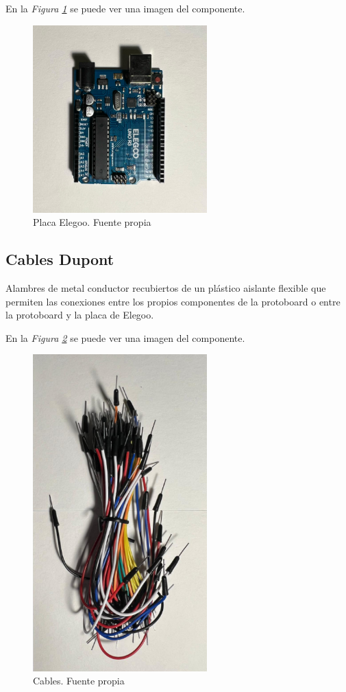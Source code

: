 En la \textit{Figura \ref{fig:Placa Elegoo}} se puede ver una imagen del componente.
\begin{figure}[h]
        \centering
        \includegraphics[angle=90,width=0.6\textwidth]{img/placa elegoo.png}
        \caption{Placa Elegoo. Fuente propia}
        \label{fig:Placa Elegoo}
    \end{figure}

\subsection{Cables Dupont}
Alambres de metal conductor recubiertos de un plástico aislante flexible que permiten las conexiones entre los propios componentes de la protoboard o entre la protoboard y la placa de Elegoo. 

En la \textit{Figura \ref{fig:cable_dupont}} se puede ver una imagen del componente.
\begin{figure}[h]
        \centering
        \includegraphics[angle=90,width=0.6\textwidth]{img/cable_dupont.png}
        \caption{Cables. Fuente propia}
        \label{fig:cable_dupont}
    \end{figure}
   
